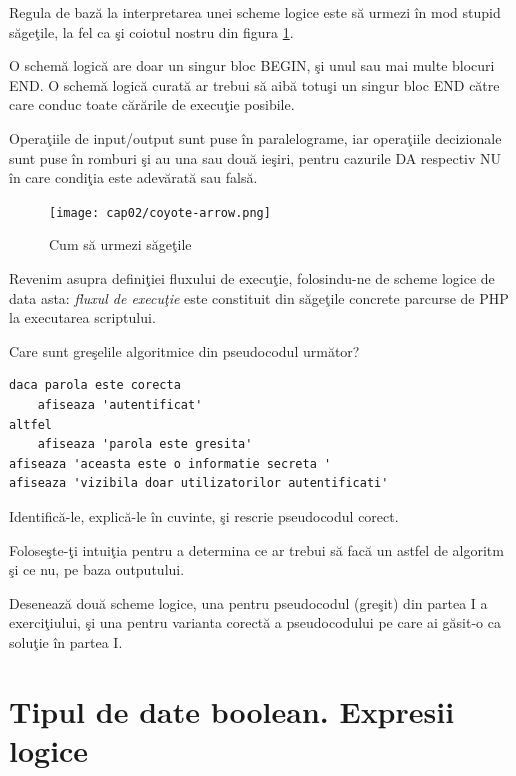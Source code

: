 Regula de bază la interpretarea unei scheme logice
este să urmezi în mod stupid săgeţile, la fel ca şi
coiotul nostru din figura \ref{fig:coyote arrow}.

O schemă logică are doar un singur bloc {\glqq}BEGIN{\grqq}, şi unul
sau mai multe blocuri {\glqq}END{\grqq}. O schemă logică curată
ar trebui să aibă totuşi un singur bloc {\glqq}END{\grqq}
către care conduc toate {\glqq}cărările{\grqq} de execuţie posibile.

Operaţiile de input/output sunt puse în paralelograme,
iar operaţiile decizionale sunt puse în romburi şi au
una sau două ieşiri, pentru cazurile {\glqq}DA{\grqq} respectiv {\glqq}NU{\grqq}
în care condiţia este adevărată sau falsă.

\begin{figure}[ht!]
  \centering
    \texttt{[image: cap02/coyote-arrow.png]}
  \caption{Cum să urmezi săgeţile}
  \label{fig:coyote arrow}
\end{figure}

Revenim asupra definiţiei fluxului de execuţie, folosindu-ne de scheme logice de data asta:
\textit{fluxul de execuţie} este constituit din săgeţile concrete parcurse de PHP
la executarea scriptului.

\begin{Exercise}[difficulty=2,title={Găseşte eroarea de logică}]
\ExePart
Care sunt greşelile algoritmice din pseudocodul următor?

\begin{lstlisting}[language=pseudocod]
daca parola este corecta
	afiseaza 'autentificat'
altfel
	afiseaza 'parola este gresita'
afiseaza 'aceasta este o informatie secreta '
afiseaza 'vizibila doar utilizatorilor autentificati'
\end{lstlisting}

Identifică-le, explică-le în cuvinte, şi rescrie pseudocodul corect.

Foloseşte-ţi intuiţia pentru a determina ce ar trebui
să facă un astfel de algoritm şi ce nu, pe baza outputului.

\ExePart
Desenează două scheme logice, una pentru pseudocodul (greşit)
din partea I a exerciţiului, şi una pentru varianta corectă
a pseudocodului pe care ai găsit-o ca soluţie în partea I.
\end{Exercise}


\section{Tipul de date boolean. Expresii logice}
\label{sec:tipul de date boolean. Expresii logice}

